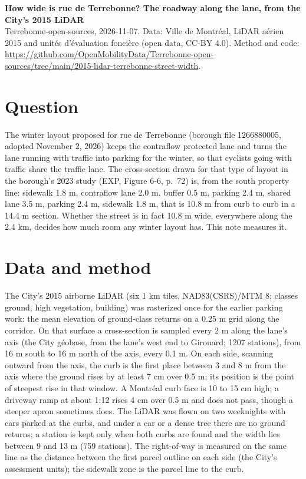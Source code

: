 \documentclass[11pt,a4paper]{article}
\begin{document}
{\LARGE\textbf{How wide is rue de Terrebonne? The roadway along the lane, from the City\textquoteright{}s 2015 LiDAR}}\\[4pt]
{\small Terrebonne-open-sources, 2026-11-07. Data: Ville de Montréal, LiDAR aérien 2015 and unités d\textquoteright{}évaluation foncière (open data, CC-BY 4.0). Method and code: \url{https://github.com/OpenMobilityData/Terrebonne-open-sources/tree/main/2015-lidar-terrebonne-street-width}.}

\section*{Question}
The winter layout proposed for rue de Terrebonne (borough file 1266880005, adopted November 2, 2026) keeps the contraflow protected lane and turns the lane running with traffic into parking for the winter, so that cyclists going with traffic share the traffic lane. The cross-section drawn for that type of layout in the borough\textquoteright{}s 2023 study (EXP, Figure 6-6, p.~72) is, from the south property line: sidewalk 1.8 m, contraflow lane 2.0 m, buffer 0.5 m, parking 2.4 m, shared lane 3.5 m, parking 2.4 m, sidewalk 1.8 m, that is 10.8 m from curb to curb in a 14.4 m section. Whether the street is in fact 10.8 m wide, everywhere along the 2.4 km, decides how much room any winter layout has. This note measures it.

\section*{Data and method}
The City\textquoteright{}s 2015 airborne LiDAR (six 1 km tiles, NAD83(CSRS)/MTM 8; classes ground, high vegetation, building) was rasterized once for the earlier parking work: the mean elevation of ground-class returns on a 0.25 m grid along the corridor. On that surface a cross-section is sampled every 2 m along the lane\textquoteright{}s axis (the City géobase, from the lane\textquoteright{}s west end to Girouard; 1207 stations), from 16 m south to 16 m north of the axis, every 0.1 m. On each side, scanning outward from the axis, the curb is the first place between 3 and 8 m from the axis where the ground rises by at least 7 cm over 0.5 m; its position is the point of steepest rise in that window. A Montréal curb face is 10 to 15 cm high; a driveway ramp at about 1:12 rises 4 cm over 0.5 m and does not pass, though a steeper apron sometimes does. The LiDAR was flown on two weeknights with cars parked at the curbs, and under a car or a dense tree there are no ground returns; a station is kept only when both curbs are found and the width lies between 9 and 13 m (759 stations). The right-of-way is measured on the same line as the distance between the first parcel outline on each side (the City\textquoteright{}s assessment units); the sidewalk zone is the parcel line to the curb.
\end{document}

